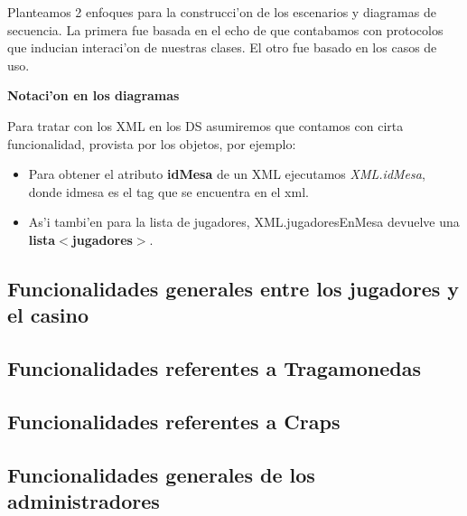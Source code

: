 Planteamos 2 enfoques para la construcci'on de los escenarios y diagramas de secuencia. La primera 
fue basada en el echo de que contabamos con protocolos que inducian interaci'on de
nuestras clases. El otro fue basado en los casos de uso.

\textbf{Notaci'on en los diagramas}

Para tratar con los XML en los DS asumiremos que contamos con cirta funcionalidad, provista por los objetos, por ejemplo:
\begin{itemize}
\item  Para obtener el atributo \textbf{idMesa} de un XML ejecutamos \textit{XML.idMesa}, donde idmesa es el tag que se encuentra en el xml.
\item As'i tambi'en para la lista de jugadores, XML.jugadoresEnMesa devuelve una \textbf{lista$<$jugadores$>$}.

\end{itemize}










\subsection{Funcionalidades generales entre los jugadores y el casino}



\subsection{Funcionalidades referentes a Tragamonedas}



\subsection{Funcionalidades referentes a Craps}



\subsection{Funcionalidades generales de los administradores}

